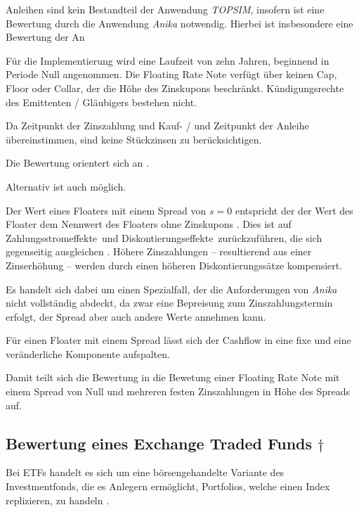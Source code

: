 \documentclass[12pt, a4paper]{article}
\begin{document}
Anleihen sind kein Bestandteil der Anwendung \textit{TOPSIM}, insofern ist eine Bewertung durch die Anwendung \textit{Anika} notwendig.
Hierbei ist insbesondere eine Bewertung der An

Für die Implementierung wird eine Laufzeit von zehn Jahren, beginnend in Periode Null angenommen.
Die Floating Rate Note verfügt über keinen Cap, Floor oder Collar, der die Höhe des Zinskupons beschränkt.
Kündigungsrechte des Emittenten / Gläubigers bestehen nicht.

Da Zeitpunkt der Zinszahlung und Kauf- / und Zeitpunkt der Anleihe übereinstimmen, sind keine Stückzinsen zu berücksichtigen.

Die Bewertung orientert sich an \autocite[][]{veronesi_fixed_2010}.

Alternativ ist auch \autocite[][]{fabozzi_handbook_2005} möglich.

Der Wert eines Floaters mit einem Spread von $s=0$ entspricht der der Wert des Floater dem Nennwert des Floaters ohne Zinskupons \autocite[][S.~52~f.]{veronesi_fixed_2010}. Dies ist auf \glqq Zahlungsstromeffekte\grqq~und \glqq Diskontierungseffekte\grqq~zurückzuführen, die sich gegenseitig ausgleichen \autocite[][S.~54]{veronesi_fixed_2010}. Höhere Zinszahlungen -- resultierend aus einer Zinserhöhung -- werden durch einen höheren Diskontierungssätze kompensiert.

Es handelt sich dabei um einen Spezialfall, der die Anforderungen von \textit{Anika} nicht vollständig abdeckt, da zwar eine Bepreisung zum Zinszahlungstermin erfolgt, der Spread aber auch andere Werte annehmen kann.

Für einen Floater mit einem Spread lässt sich der Cashflow in eine fixe und eine veränderliche Komponente aufspalten.

Damit teilt sich die Bewertung in die Bewetung einer Floating Rate Note mit einem Spread von Null und mehreren festen Zinszahlungen in Höhe des Spreads auf.


\subsection{Bewertung eines Exchange Traded Funds $\dagger$}
\label{sec:bewertung_eines_exchange_traded_funds}
Bei {ETFs} handelt es sich um eine börsengehandelte Variante des Investmentfonds, die es Anlegern ermöglicht, Portfolios, welche einen Index replizieren, zu handeln \autocite[][S.~103]{bodie_investments_2018}. 
\end{document}
